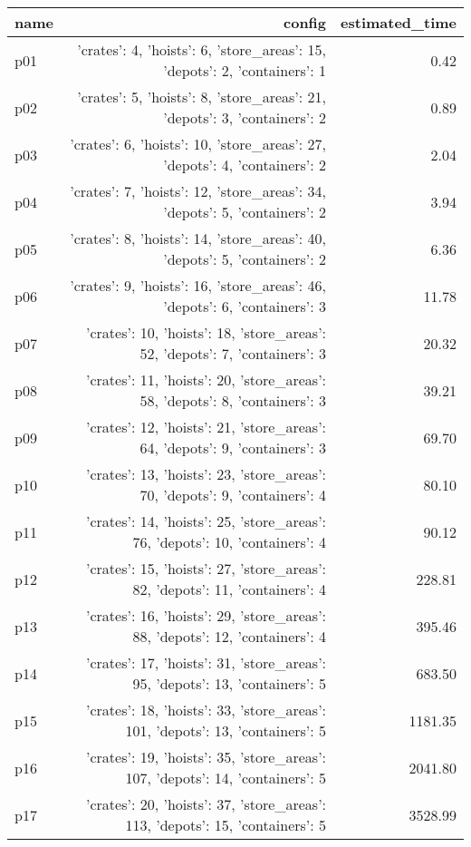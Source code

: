 \documentclass{article}
\begin{document}
                            \begin{center}
                            \scriptsize
                            \begin{tabular}{@{}l|r|r@{}}
                            name & config & estimated\_time\\\midrule
                              p01&{'crates': 4, 'hoists': 6, 'store\_areas': 15, 'depots': 2, 'containers': 1}&0.42\\
  p02&{'crates': 5, 'hoists': 8, 'store\_areas': 21, 'depots': 3, 'containers': 2}&0.89\\
  p03&{'crates': 6, 'hoists': 10, 'store\_areas': 27, 'depots': 4, 'containers': 2}&2.04\\
  p04&{'crates': 7, 'hoists': 12, 'store\_areas': 34, 'depots': 5, 'containers': 2}&3.94\\
  p05&{'crates': 8, 'hoists': 14, 'store\_areas': 40, 'depots': 5, 'containers': 2}&6.36\\
  p06&{'crates': 9, 'hoists': 16, 'store\_areas': 46, 'depots': 6, 'containers': 3}&11.78\\
  p07&{'crates': 10, 'hoists': 18, 'store\_areas': 52, 'depots': 7, 'containers': 3}&20.32\\
  p08&{'crates': 11, 'hoists': 20, 'store\_areas': 58, 'depots': 8, 'containers': 3}&39.21\\
  p09&{'crates': 12, 'hoists': 21, 'store\_areas': 64, 'depots': 9, 'containers': 3}&69.70\\
  p10&{'crates': 13, 'hoists': 23, 'store\_areas': 70, 'depots': 9, 'containers': 4}&80.10\\
  p11&{'crates': 14, 'hoists': 25, 'store\_areas': 76, 'depots': 10, 'containers': 4}&90.12\\
  p12&{'crates': 15, 'hoists': 27, 'store\_areas': 82, 'depots': 11, 'containers': 4}&228.81\\
  p13&{'crates': 16, 'hoists': 29, 'store\_areas': 88, 'depots': 12, 'containers': 4}&395.46\\
  p14&{'crates': 17, 'hoists': 31, 'store\_areas': 95, 'depots': 13, 'containers': 5}&683.50\\
  p15&{'crates': 18, 'hoists': 33, 'store\_areas': 101, 'depots': 13, 'containers': 5}&1181.35\\
  p16&{'crates': 19, 'hoists': 35, 'store\_areas': 107, 'depots': 14, 'containers': 5}&2041.80\\
  p17&{'crates': 20, 'hoists': 37, 'store\_areas': 113, 'depots': 15, 'containers': 5}&3528.99\\

\end{tabular}
\end{center}
\end{document}

